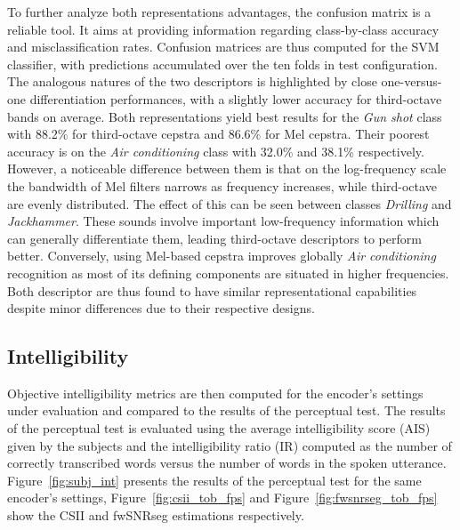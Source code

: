 \documentclass[12pt,times,onecolumn]{article}
\begin{document}
To further analyze both representations advantages, the confusion matrix is a reliable tool. It aims at providing information regarding class-by-class accuracy and misclassification rates. Confusion matrices are thus computed for the SVM classifier, with predictions accumulated over the ten folds in test configuration. The analogous natures of the two descriptors is highlighted by close one-versus-one differentiation performances, with a slightly lower accuracy for third-octave bands on average. Both representations yield best results for the \textit{Gun shot} class with 88.2\% for third-octave cepstra and 86.6\% for Mel cepstra. Their poorest accuracy is on the \textit{Air conditioning} class with 32.0\% and 38.1\% respectively. However, a noticeable difference between them is that on the log-frequency scale the bandwidth of Mel filters narrows as frequency increases, while third-octave are evenly distributed. The effect of this can be seen between classes \textit{Drilling} and \textit{Jackhammer}. These sounds involve important low-frequency information which can generally differentiate them, leading third-octave descriptors to perform better. Conversely, using Mel-based cepstra improves globally \textit{Air conditioning} recognition as most of its defining components are situated in higher frequencies.\\

Both descriptor are thus found to have similar representational capabilities despite minor differences due to their respective designs.

\subsection{Intelligibility}

Objective intelligibility metrics are then computed for the encoder's settings under evaluation and compared to the results of the perceptual test. The results of the perceptual test is evaluated using the average intelligibility score (AIS) given by the subjects and the intelligibility ratio (IR) computed as the number of correctly transcribed words versus the number of words in the spoken utterance. Figure~\ref{fig:subj_int} presents the results of the perceptual test for the same encoder's settings, Figure~\ref{fig:csii_tob_fps} and Figure~\ref{fig:fwsnrseg_tob_fps} show the CSII and fwSNRseg estimations respectively.
\end{document}
